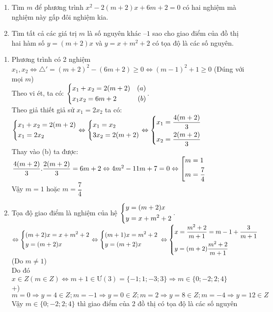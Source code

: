 \begin{ex}%
    \hfill
    \begin{enumerate}
        \item  Tìm $m$ để phương trình $x^2-2(m+2)x+6m+2=0$ có hai nghiệm mà nghiệm
        này gấp đôi nghiệm kia.
        \item Tìm tất cả các giá trị $m$ là số nguyên khác $–1$ sao cho giao điểm của đồ thị hai
        hàm số $y=(m+2)x $ và $y=x+m^2+2$ có tọa độ là các số nguyên.
    \end{enumerate}
\loigiai
    {
    \begin{enumerate}
        \item Phương trình có 2 nghiệm $x_1,x_2 \Leftrightarrow \triangle'=(m+2)^2-(6m+2)\geq 0\Leftrightarrow(m-1)^2+1\geq 0$ (Đúng với mọi $m$)\\
        Theo vi ét, ta có: $\left\{\begin{aligned}&x_1+x_2=2(m+2)&(a)\\&x_1x_2=6m+2&(b)\end{aligned}\right. $.\\
         Theo giả thiết giả sử $x_1=2x_2$ ta có:\\
        $ \left\{\begin{aligned}&x_1+x_2=2(m+2)\\&x_1=2x_2\end{aligned}\right.\Leftrightarrow\left\{\begin{aligned}&x_1=x_2\\&3x_2=2(m+2)\end{aligned}\right.\Leftrightarrow\left\{\begin{aligned} &x_1=\dfrac{4(m+2)}{3}\\&x_2=\dfrac{2(m+2)}{3}\end{aligned}\right. $\\
        Thay vào (b) ta được:\\
        $\dfrac{4(m+2)}{3}.\dfrac{2(m+2)}{3}=6m+2\Leftrightarrow 4m^2-11m+7=0\Leftrightarrow \left[\begin{aligned}&m=1\\&m=\dfrac{7}{4}\end{aligned}\right. $\\
        Vậy $m=1$ hoặc $m=\dfrac{7}{4} $
        \item Tọa độ giao điểm là nghiệm của hệ $\left\{\begin{aligned}&y=(m+2)x\\&y=x+m^2+2\end{aligned}\right..$\\
        $\Leftrightarrow\left\{\begin{aligned}&(m+2)x=x+m^2+2\\&y=(m+2)x\end{aligned}\right.\Leftrightarrow \left\{\begin{aligned}&(m+1)x=m^2+2\\&y=(m+2)x\end{aligned}\right.\\\Leftrightarrow\left\{\begin{aligned}&x=\dfrac{m^2+2}{m+1}=m-1+\dfrac{3}{m+1}\\&y=(m+2)\dfrac{m^2+2}{m+1}\end{aligned}\right.$ (Do $m\neq 1 $)\\
        Do đó $x\in Z(m\in Z) \Leftrightarrow m+1\in Ư(3)=\{-1;1;-3;3\}\Rightarrow m\in\{0;-2;2;4\}$\\
        +) $m=0\Rightarrow y=4\in Z; m=-1\Rightarrow y=0\in Z; m=2\Rightarrow y=8\in Z; m=-4\Rightarrow y=12\in Z $\\
      Vậy $m\in\{0;-2;2;4\}$ thì giao điểm của 2 đồ thị có tọa độ là các số nguyên
    \end{enumerate}
    }
\end{ex}

